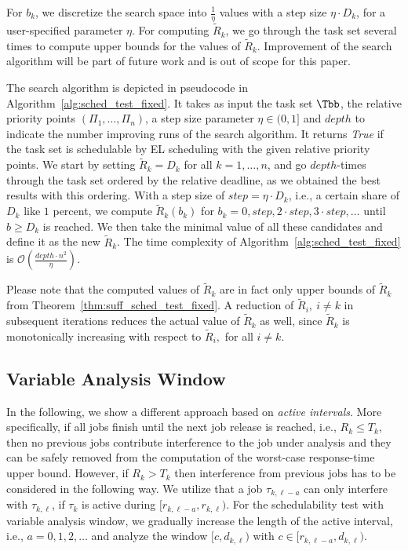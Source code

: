 \documentclass[conference]{IEEEtran}
\theoremstyle{definition}
\theoremstyle{remark}
\newcommand{\Rtilde}{\widetilde{R}}
\begin{document}
    For $b_k$, we discretize the search space into $\frac{1}{\eta}$ values with a step size $\eta \cdot D_k$, for a user-specified parameter $\eta$. For computing $\Rtilde_k$, we go through the task set several times to compute upper bounds for the values of $\Rtilde_k$.
	Improvement of the search algorithm will be part of future work and is out of scope for this paper.

    
	The search algorithm is depicted in pseudocode in Algorithm~\ref{alg:sched_test_fixed}.
	It takes as input the task set $\Tbb$, the relative priority points $(\Pi_1, \dots, \Pi_n)$, a step size parameter $\eta \in (0,1]$ and $depth$ to indicate the number improving runs of the search algorithm.
	It returns \emph{True} if the task set is schedulable by EL scheduling with the given relative priority points.
	We start by setting $\Rtilde_k = D_k$ for all $k=1, \dots, n$, and go $depth$-times through the task set ordered by the relative deadline, as we obtained the best results with this ordering.
	With  a step size of $step = \eta \cdot D_k$, i.e., a certain share of $D_k$ like $1$ percent, we compute $\Rtilde_k(b_k)$ for $b_k=0,step,2\cdot step, 3\cdot step, \dots$ until $b \geq D_k$ is reached.
	We then take the minimal value of all these candidates and define it as the new $\Rtilde_k$.
    The time complexity of Algorithm~\ref{alg:sched_test_fixed} is $\mathcal{O}\left(\frac{depth\cdot n^2}{\eta}\right)$.
	
	Please note that the computed values of $\Rtilde_k$ are in fact only upper bounds of $\Rtilde_k$ from Theorem~\ref{thm:suff_sched_test_fixed}.
	A reduction of $\Rtilde_i,~i\neq k$ in subsequent iterations reduces the actual value of $\Rtilde_k$ as well, since $\Rtilde_k$ is monotonically increasing with respect to $\Rtilde_i,$ for all $i\neq k$.

	
\subsection{Variable Analysis Window}
	\label{sec:test_arb}
	
	

	In the following, we show a different approach based on \emph{active intervals}.
	More specifically, if all jobs finish until the next job release is reached, i.e., $R_k \leq T_k$, then no previous jobs contribute interference to the job under analysis and they can be safely removed from the computation of the worst-case response-time upper bound.
	However, if $R_k > T_k$ then interference from previous jobs has to be considered in the following way.
	We utilize that a job $\tau_{k,\ell-a}$ can only interfere with $\tau_{k,\ell}$, if $\tau_k$ is active during $[r_{k,\ell-a}, r_{k,\ell})$.
	For the schedulability test with variable analysis window, we gradually increase the length of the active interval, i.e., $a = 0,1,2,\dots$ and analyze the window $[c,d_{k,\ell})$ with $c \in [r_{k,\ell-a}, d_{k,\ell})$.
	
\end{document}

